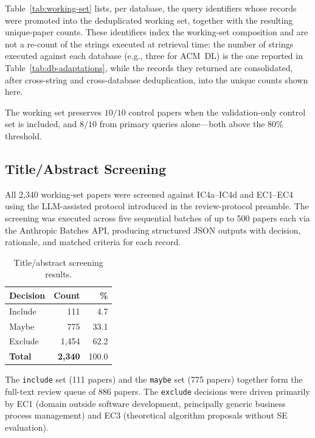 Table~\ref{tab:working-set} lists, per database, the query identifiers whose
records were promoted into the deduplicated working set, together with the
resulting unique-paper counts. These identifiers index the working-set
composition and are not a re-count of the strings executed at retrieval time:
the number of strings executed against each database (e.g., three for
ACM~DL) is the one reported in Table~\ref{tab:db-adaptations}, while the
records they returned are consolidated, after cross-string and cross-database
deduplication, into the unique counts shown here.

The working set preserves $10/10$ control papers when the validation-only
control set is included, and $8/10$ from primary queries alone---both above
the 80\% threshold.

\subsection{Title/Abstract Screening}

All 2{,}340 working-set papers were screened against IC4a--IC4d and
EC1--EC4 using the LLM-assisted protocol introduced in the review-protocol
preamble. The screening was executed across five sequential batches of up
to 500 papers each via the Anthropic Batches API, producing structured
JSON outputs with decision, rationale, and matched criteria for each
record.

\begin{table}[htbp]
\centering
\caption{Title/abstract screening results.}
\label{tab:ta-screening}
\begin{tabular}{lrr}
\toprule
\textbf{Decision} & \textbf{Count} & \textbf{\%} \\
\midrule
Include & 111 & 4.7 \\
Maybe   & 775 & 33.1 \\
Exclude & 1{,}454 & 62.2 \\
\midrule
\textbf{Total} & \textbf{2{,}340} & 100.0 \\
\bottomrule
\end{tabular}
\end{table}

The \texttt{include} set (111 papers) and the \texttt{maybe} set (775 papers)
together form the full-text review queue of 886 papers. The
\texttt{exclude} decisions were driven primarily by EC1 (domain outside
software development, principally generic business process management) and EC3
(theoretical algorithm proposals without SE evaluation).

